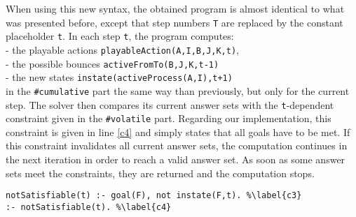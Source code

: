 When using this new syntax, the obtained program is almost identical
to what was presented before,
except that step numbers \texttt{T}
are replaced by the constant placeholder \texttt{t}.
In each step \texttt{t}, the program computes: \\
  - the playable actions 
   \texttt{playableAction(A,I,B,J,K,t)}, \\
  - the possible bounces \texttt{activeFromTo(B,J,K,t-1)} \\
  - the new states
   \texttt{instate(activeProcess(A,I),t+1)}\\

in the \texttt{\#cumulative} part
the same way than previously, but only for the current step.
The solver then compares its current answer sets with
the \texttt{t}-dependent constraint given in the \texttt{\#volatile} part.
Regarding our implementation, this constraint is given in line \ref{c4}
and simply states that all goals have to be met.
If this constraint invalidates all current answer sets,
the computation continues in the next iteration in order to reach a valid answer set.
As soon as some answer sets meet the constraints,
they are returned and the computation stops.
\begin{lstlisting}
notSatisfiable(t) :- goal(F), not instate(F,t). %\label{c3}
:- notSatisfiable(t). %\label{c4}
\end{lstlisting}

